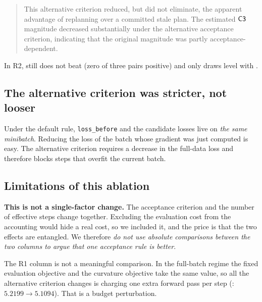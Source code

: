 \begin{quote}
This alternative criterion reduced, but did not eliminate, the apparent advantage
of replanning over a committed stale plan. The estimated $\textsf{C3}$ magnitude
decreased substantially under the alternative acceptance criterion, indicating that
the original magnitude was partly acceptance-dependent.
\end{quote}

In R2,  still does not beat  (zero of three
pairs positive) and only draws level with .

\subsection{The alternative criterion was stricter, not looser}
\label{sec:stricter}

\begin{table}[!ht]
  \centering
  
  \caption{Median rejection rate under the two acceptance criteria. Rejection rates
  \emph{rose} under the alternative criterion.}
  \label{tab:acceptance-rejection}
\end{table}

Under the default rule, \texttt{loss\_before} and the candidate losses live on
\emph{the same minibatch}. Reducing the loss of the batch whose gradient was just
computed is easy. The alternative criterion requires a decrease in the full-data
loss and therefore blocks steps that overfit the current batch.

\subsection{Limitations of this ablation}
\label{sec:ablation-limits}

\textbf{This is not a single-factor change.} The acceptance criterion and the
number of effective steps change together. Excluding the evaluation cost from the
accounting would hide a real cost, so we included it, and the price is that the two
effects are entangled. We therefore \emph{do not use absolute comparisons between
the two columns to argue that one acceptance rule is better}.

The R1 column is not a meaningful comparison. In the full-batch regime the fixed
evaluation objective and the curvature objective take the same value, so all the
alternative criterion changes is charging one extra forward pass per step
(: $5.2199 \rightarrow 5.1094$). That is a budget perturbation.
